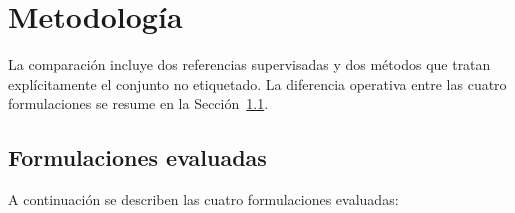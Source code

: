 \section{Metodología}

La comparación incluye dos referencias supervisadas y dos métodos que tratan explícitamente el conjunto no etiquetado. La diferencia operativa entre las cuatro formulaciones se resume en la Sección~\ref{sec:pu_formulaciones}.

\subsection{Formulaciones evaluadas}\label{sec:pu_formulaciones}

A continuación se describen las cuatro formulaciones evaluadas:



